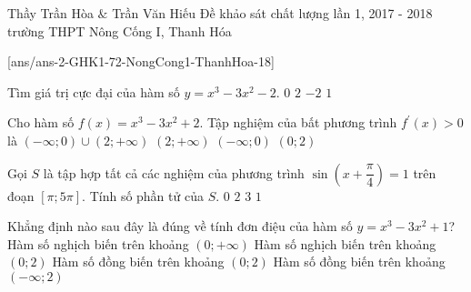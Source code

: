 \begin{name}
{Thầy Trần Hòa $\&$ Trần Văn Hiếu}
{Đề khảo sát chất lượng lần 1, 2017 - 2018 trường THPT Nông Cống I, Thanh Hóa}
\end{name}
\setcounter{ex}{0}
[ans/ans-2-GHK1-72-NongCong1-ThanhHoa-18]
\begin{ex}%
Tìm giá trị cực đại của hàm số $y=x^3-3x^2-2$.
\choice
{$0$}
{$2$}
{\True $-2$}
{$1$}
\end{ex}
\begin{ex}%
Cho hàm số $f(x)=x^3-3x^2+2$. Tập nghiệm của bất phương trình $f^\prime (x) >0$ là
\choice
{\True $(-\infty; 0) \cup (2;+\infty)$}
{$(2;+\infty)$}
{$(-\infty;0)$}
{$(0;2)$}
\end{ex}

\begin{ex}%
Gọi $S$ là tập hợp tất cả các nghiệm của phương trình $\sin \left(x+\dfrac{\pi}{4} \right)=1$ trên đoạn $\left[ \pi; 5\pi \right]$. Tính số phần tử của $S$.
\choice
{$0$}
{\True $2$}
{$3$}
{$1$}
\end{ex}

\begin{ex}%
Khẳng định nào sau đây là đúng về tính đơn điệu của hàm số $y=x^3-3x^2+1$?
\choice
{Hàm số nghịch biến trên khoảng $(0; +\infty)$}
{\True Hàm số nghịch biến trên khoảng $(0;2)$}
{Hàm số đồng biến trên khoảng $(0;2)$}
{Hàm số đồng biến trên khoảng $(-\infty; 2)$}
\end{ex}

